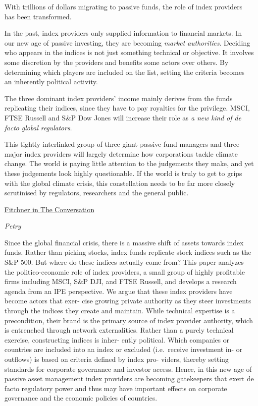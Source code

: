 \documentclass[
]{book}
\begin{document}
With trillions of dollars migrating to passive funds, the role of index providers has been transformed.

In the past, index providers only supplied information to financial markets. In our new age of passive investing, they are becoming \emph{market authorities}.
Deciding who appears in the indices is not just something technical or objective. It involves some discretion by the providers and benefits some actors over others. By determining which players are included on the list, setting the criteria becomes an inherently political activity.

The three dominant index providers' income mainly derives from the funds replicating their indices, since they have to pay royalties for the privilege.
MSCI, FTSE Russell and S\&P Dow Jones will increase their role as \emph{a new kind of de facto
global regulators}.

This tightly interlinked group of three giant passive fund managers and three major index providers will largely determine how corporations tackle climate change. The world is paying little attention to the judgements they make, and yet these judgements look highly questionable. If the world is truly to get to grips with the global climate crisis, this constellation needs to be far more closely scrutinised by regulators, researchers and the general public.

\href{https://theconversation.com/three-financial-firms-could-change-the-direction-of-the-climate-crisis-and-few-people-have-any-idea-131869}{Fitchner in The Conversation}

\emph{Petry}

Since the global financial crisis, there is a massive shift of assets towards index
funds. Rather than picking stocks, index funds replicate stock indices such as the
S\&P 500. But where do these indices actually come from? This paper analyzes the
politico-economic role of index providers, a small group of highly profitable firms
including MSCI, S\&P DJI, and FTSE Russell, and develops a research agenda from an
IPE perspective. We argue that these index providers have become actors that exer-
cise growing private authority as they steer investments through the indices they
create and maintain. While technical expertise is a precondition, their brand is the
primary source of index provider authority, which is entrenched through network
externalities. Rather than a purely technical exercise, constructing indices is inher-
ently political. Which companies or countries are included into an index or excluded
(i.e.~receive investment in- or outflows) is based on criteria defined by index pro-
viders, thereby setting standards for corporate governance and investor access.
Hence, in this new age of passive asset management index providers are becoming
gatekeepers that exert de facto regulatory power and thus may have important
effects on corporate governance and the economic policies of countries.
\end{document}
